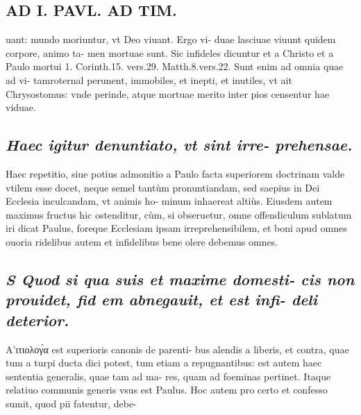 \documentclass{article}
\begin{document}
\begin{pages}
\section*{AD I. PAVL. AD TIM. }
\marginpar{[ p.264 ]}\pstart uant: mundo moriuntur, vt Deo viuant. Ergo vi- duae lasciuae viuunt quidem corpore, animo ta- men mortuae sunt. Sic infideles dicuntur et a Christo et a Paulo mortui 1. Corinth.15. vers.29. Matth.8.vers.22. Sunt enim ad omnia quae ad vi- tamroternal perunent, immobiles, et inepti, et inutiles, vt ait Chrysostomus: vnde perinde, atque  mortuae merito inter pios censentur hae viduae.  \pend
{}
{}
\subsection*{\textit{Haec igitur denuntiato, vt sint irre- prehensae. }}\pstart Haec repetitio, siue potius admonitio a Paulo facta superiorem doctrinam valde vtilem esse docet, neque semel tantùm pronuntiandam, sed saepius in Dei Ecclesia inculcandam, vt animis ho- minum inhaereat altiùs. Eiusdem autem maximus fructus hic ostenditur, cùm, si obseruetur, omne offendiculum sublatum iri dicat Paulus, foreque Ecclesiam ipsam irreprehensibilem, et boni apud omnes ouoria ridelibus autem et infidelibus bene olere debemus omnes.  \pend
{}
{}
\subsection*{\textit{S Quod si qua suis et maxime domesti- cis non prouidet, fid em abnegauit, et est infi- deli deterior. }}\pstart Α’ιτιολογ́α est superioris canonis de parenti- bus alendis a liberis, et contra, quae tum a turpi ducta dici potest, tum etiam a repugnantibus: est autem haec sententia generalis, quae tam ad ma- res, quam ad foeminas pertinet. Itaque relatiuo communis generis vsus est Paulus. Hoc autem pro certo et confesso sumit, quod pii fatentur, debe-  \pend

\end{pages}
\end{document}
